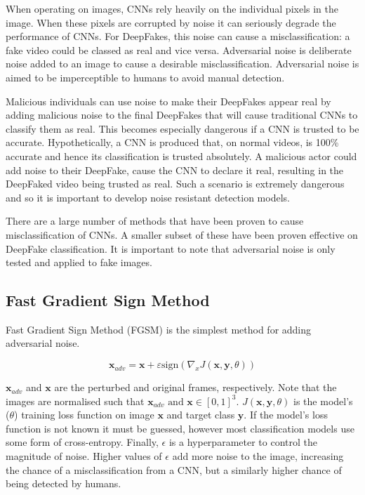 When operating on images, CNNs rely heavily on the individual pixels in the image. When these pixels are corrupted by noise it can seriously degrade the performance of CNNs\cite{yim2017enhancing}. For DeepFakes, this noise can cause a misclassification: a fake video could be classed as real and vice versa. Adversarial noise is deliberate noise added to an image to cause a desirable misclassification. Adversarial noise is aimed to be imperceptible to humans to avoid manual detection.

Malicious individuals can use noise to make their DeepFakes appear real by adding malicious noise to the final DeepFakes that will cause traditional CNNs to classify them as real. This becomes especially dangerous if a CNN is trusted to be accurate. Hypothetically, a CNN is produced that, on normal videos, is 100\% accurate and hence its classification is trusted absolutely. A malicious actor could add noise to their DeepFake, cause the CNN to declare it real, resulting in the DeepFaked video being trusted as real. Such a scenario is extremely dangerous and so it is important to develop noise resistant detection models.

There are a large number of methods that have been proven to cause misclassification of CNNs. A smaller subset of these have been proven effective on DeepFake classification. It is important to note that adversarial noise is only tested and applied to fake images.

\subsection{Fast Gradient Sign Method}
\label{sec:fgsm}

Fast Gradient Sign Method (FGSM)\cite{goodfellow2014explaining} is the simplest method for adding adversarial noise.

\begin{equation}
    \label{eq:fgsm}
    \mathbf{x}_{adv} = \mathbf{x} + \varepsilon \text{sign}(\nabla_x J(\mathbf{x},\mathbf{y}, \theta))
\end{equation}

$\mathbf{x}_{adv}$ and $\mathbf{x}$ are the perturbed and original frames, respectively. Note that the images are normalised such that $\mathbf{x}_{adv}\text{ and }\mathbf{x}\in[0,1]^3$. $J(\mathbf{x},\mathbf{y}, \theta)$ is the model's ($\theta$) training loss function on image $\textbf{x}$ and target class $\textbf{y}$. If the model's loss function is not known it must be guessed, however most classification models use some form of cross-entropy. Finally, $\epsilon$ is a hyperparameter to control the magnitude of noise. Higher values of $\epsilon$ add more noise to the image, increasing the chance of a misclassification from a CNN, but a similarly higher chance of being detected by humans.

